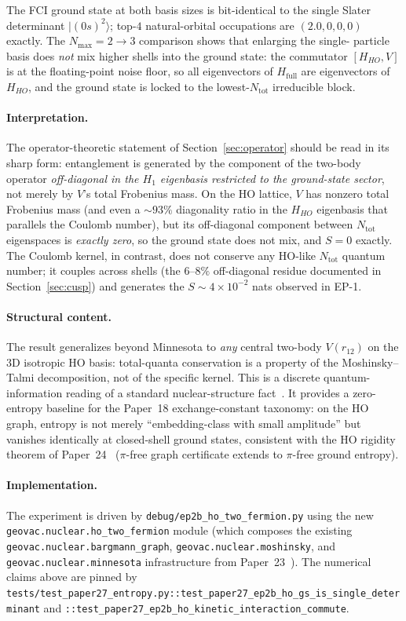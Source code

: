 \documentclass[twocolumn,pra,amsmath,amssymb,superscriptaddress]{revtex4-2}
\begin{document}
The FCI ground state at both basis sizes is bit-identical to
the single Slater determinant $|(0s)^{2}\rangle$; top-$4$
natural-orbital occupations are $(2.0, 0, 0, 0)$ exactly.  The
$N_{\max}=2\to 3$ comparison shows that enlarging the single-
particle basis does \emph{not} mix higher shells into the
ground state: the commutator $[H_{HO}, V]$ is at the
floating-point noise floor, so all eigenvectors of $H_{\mathrm{full}}$
are eigenvectors of $H_{HO}$, and the ground state is locked
to the lowest-$N_{\mathrm{tot}}$ irreducible block.

\paragraph*{Interpretation.}  The operator-theoretic statement
of Section~\ref{sec:operator} should be read in its sharp form:
entanglement is generated by the component of the two-body
operator \emph{off-diagonal in the $H_1$ eigenbasis restricted
to the ground-state sector}, not merely by $V$'s total Frobenius
mass.  On the HO lattice, $V$ has nonzero total Frobenius mass
(and even a $\sim 93\%$ diagonality ratio in the $H_{HO}$
eigenbasis that parallels the Coulomb number), but its
off-diagonal component between $N_{\mathrm{tot}}$ eigenspaces is
\emph{exactly zero}, so the ground state does not mix, and
$S=0$ exactly.  The Coulomb kernel, in contrast, does not
conserve any HO-like $N_{\mathrm{tot}}$ quantum number; it
couples across shells (the $6$--$8\%$ off-diagonal residue
documented in Section~\ref{sec:cusp}) and generates the
$S\sim 4\times 10^{-2}$ nats observed in EP-1.

\paragraph*{Structural content.}  The result generalizes beyond
Minnesota to \emph{any} central two-body $V(r_{12})$ on the 3D
isotropic HO basis: total-quanta conservation is a property of
the Moshinsky--Talmi decomposition, not of the specific kernel.
This is a discrete quantum-information reading of a standard
nuclear-structure fact~\cite{Moshinsky1996}.  It provides a
zero-entropy baseline for the Paper~18 exchange-constant
taxonomy: on the HO graph, entropy is not merely
``embedding-class with small amplitude'' but vanishes
identically at closed-shell ground states, consistent with the
HO rigidity theorem of Paper~24~\cite{GeoVac_Paper24}
($\pi$-free graph certificate extends to $\pi$-free ground
entropy).

\paragraph*{Implementation.}  The experiment is driven by
\texttt{debug/ep2b\_ho\_two\_fermion.py} using the new
\texttt{geovac.nuclear.ho\_two\_fermion} module (which
composes the existing
\texttt{geovac.nuclear.bargmann\_graph},
\texttt{geovac.nuclear.moshinsky}, and
\texttt{geovac.nuclear.minnesota} infrastructure from
Paper~23~\cite{GeoVac_Paper23}).  The numerical claims above
are pinned by
\texttt{tests/test\_paper27\_entropy.py::test\_paper27\_ep2b\_ho\_gs\_is\_single\_determinant}
and
\texttt{::test\_paper27\_ep2b\_ho\_kinetic\_interaction\_commute}.
\end{document}

